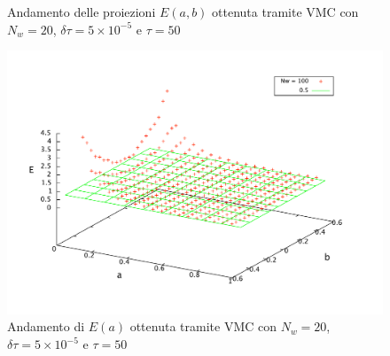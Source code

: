 \documentclass[11pt,a4paper]{article}
\begin{document}
\begin{figure}[!h]
\centering
{}
\hspace{3mm}
\caption{Andamento delle proiezioni $E(a,b)$ ottenuta tramite VMC con $N_w=20$, $\delta\tau=5\times 10^{-5}$ e $\tau=50$}
\end{figure}
\begin{figure}[!h]
\centering
\includegraphics[scale=0.35]{Img/ho_var_3d}
\caption{Andamento di $E(a)$ ottenuta tramite VMC con $N_w=20$, $\delta\tau=5\times 10^{-5}$ e $\tau=50$}
\end{figure}
\end{document}
